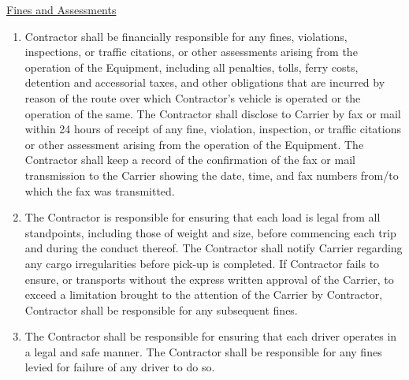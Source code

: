 \underline{Fines and Assessments}
\begin{enumerate}[
    ref = \SecondLevelEnumerator
]
    \item Contractor shall be financially responsible for any fines,
    violations, inspections, or traffic citations, or other assessments
    arising from the operation of the Equipment, including all penalties,
    tolls, ferry costs, detention and accessorial taxes, and other
    obligations that are incurred by reason of the route over which
    Contractor's vehicle is operated or the operation of the same. The
    Contractor shall disclose to Carrier by fax or mail within 24 hours of
    receipt of any fine, violation, inspection, or traffic citations or
    other assessment arising from the operation of the Equipment. The
    Contractor shall keep a record of the confirmation of the fax or mail
    transmission to the Carrier showing the date, time, and fax numbers
    from/to which the fax was transmitted.

    \item The Contractor is responsible for ensuring that each load is
    legal from all standpoints, including those of weight and size, before
    commencing each trip and during the conduct thereof. The Contractor
    shall notify Carrier regarding any cargo irregularities before pick-up
    is completed. If Contractor fails to ensure, or transports without the
    express written approval of the Carrier, to exceed a limitation brought
    to the attention of the Carrier by Contractor, Contractor shall be
    responsible for any subsequent fines.

    \item The Contractor shall be responsible for ensuring that each driver
    operates in a legal and safe manner. The Contractor shall be
    responsible for any fines levied for failure of any driver to do so.
\end{enumerate}